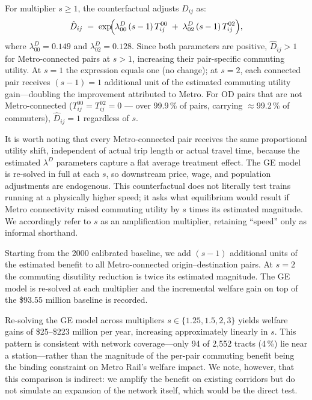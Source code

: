 \documentclass[12pt,a4paper]{article}
\begin{document}
For multiplier $s \geq 1$, the counterfactual adjusts $D_{ij}$ as:
%
\begin{equation}
  \hat{D}_{ij}
  \;=\;
  \exp\!\Bigl(
    \lambda^{D}_{00}\,(s-1)\,T^{00}_{ij}
    \;+\;
    \lambda^{D}_{02}\,(s-1)\,T^{02}_{ij}
  \Bigr),
  \label{eq:Dhat}
\end{equation}
%
where $\lambda^{D}_{00} = 0.149$ and $\lambda^{D}_{02} = 0.128$.  Since both
parameters are positive, $\hat{D}_{ij} > 1$ for Metro-connected pairs at
$s > 1$, increasing their pair-specific commuting utility.  At $s = 1$ the
expression equals one (no change); at $s = 2$, each connected pair receives
$(s-1) = 1$ additional unit of the estimated commuting utility gain---doubling
the improvement attributed to Metro.  For OD pairs that are not
Metro-connected ($T^{00}_{ij} = T^{02}_{ij} = 0$ --- over 99.9\,\% of pairs,
carrying $\approx$99.2\,\% of commuters), $\hat{D}_{ij} = 1$ regardless of $s$.

It is worth noting that every Metro-connected pair receives the same
proportional utility shift, independent of actual trip length or actual travel
time, because the estimated $\lambda^D$ parameters capture a flat average
treatment effect.  The GE model is re-solved in full at each $s$, so downstream
price, wage, and population adjustments are endogenous.  This counterfactual
does not literally test trains running at a physically higher speed; it asks
what equilibrium would result if Metro connectivity raised commuting utility by
$s$ times its estimated magnitude.  We accordingly refer to $s$ as an
amplification multiplier, retaining ``speed'' only as informal shorthand.

Starting from the 2000 calibrated baseline, we add $(s-1)$ additional units of
the estimated benefit to all Metro-connected origin--destination pairs.  At
$s=2$ the commuting disutility reduction is twice its estimated magnitude.  The
GE model is re-solved at each multiplier and the incremental welfare gain on top
of the \$93.55 million baseline is recorded.

Re-solving the GE model across multipliers $s \in \{1.25, 1.5, 2, 3\}$ yields
welfare gains of \$25--\$223 million per year, increasing approximately linearly
in $s$.  This pattern is consistent with network coverage---only 94 of 2{,}552
tracts (4\,\%) lie near a station---rather than the magnitude of the per-pair
commuting benefit being the binding constraint on Metro Rail's welfare impact.
We note, however, that this comparison is indirect: we amplify the benefit on
existing corridors but do not simulate an expansion of the network itself, which
would be the direct test.
\end{document}
